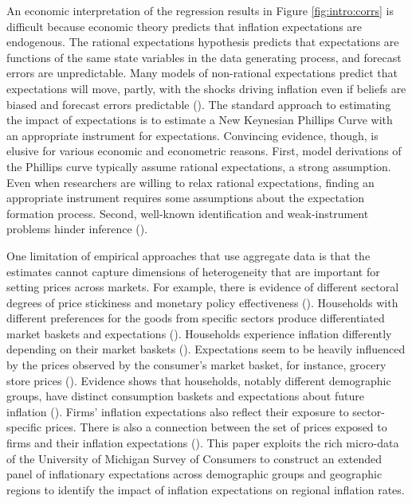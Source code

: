 \documentclass[12pt]{article}
\begin{document}
An economic interpretation of the regression results in Figure \ref{fig:intro:corrs} is difficult because economic theory predicts that inflation expectations are endogenous. The rational expectations hypothesis predicts that expectations are functions of the same state variables in the data generating process, and forecast errors are unpredictable. Many models of non-rational expectations predict that expectations will move, partly, with the shocks driving inflation even if beliefs are biased and forecast errors predictable (\cite{SophoclesJME}). The standard approach to estimating the impact of expectations is to estimate a New Keynesian Phillips Curve with an appropriate instrument for expectations. Convincing evidence, though, is elusive for various economic and econometric reasons. First, model derivations of the Phillips curve typically assume rational expectations, a strong assumption. Even when researchers are willing to relax rational expectations, finding an appropriate instrument requires some assumptions about the expectation formation process. Second, well-known identification and weak-instrument problems hinder inference (\cite{Stocketal:JEL2014}).

One limitation of empirical approaches that use aggregate data is that the estimates cannot capture dimensions of heterogeneity that are important for setting prices across markets. For example, there is evidence of different sectoral degrees of price stickiness and monetary policy effectiveness (\cite{Cravinoetal:JME2020, Boivinetal:AER2009, Almas:AER2012}). Households with different preferences for the goods from specific sectors produce differentiated market baskets and expectations (\cite{AngelicoGiacomo:WP}). Households experience inflation differently depending on their market baskets (\cite{KaplanWohl:JME2017}). Expectations seem to be heavily influenced by the prices observed by the consumer's market basket, for instance, grocery store prices (\cite{Dacunto:groceryJPE, AngelicoGiacomo:WP}). Evidence shows that households, notably different demographic groups, have distinct consumption baskets and expectations about future inflation (\cite{BryanVenkatu, Dacunto:PNAS, deBruinetal:2010, DasKahnenNagel:2020}). Firms' inflation expectations also reflect their exposure to sector-specific prices. There is also a connection between the set of prices exposed to firms and their inflation expectations (\cite{Andradeetal:JME2021}). This paper exploits the rich micro-data of the University of Michigan Survey of Consumers to construct an extended panel of inflationary expectations across demographic groups and geographic regions to identify the impact of inflation expectations on regional inflation rates.
\end{document}

